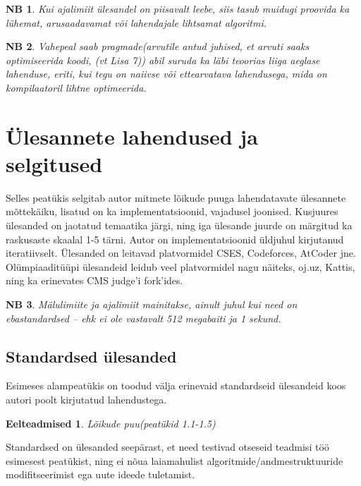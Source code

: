 \documentclass{trkut}
\newtheorem*{prereq}{Eelteadmised}
\newtheorem*{extra}{NB}
\begin{document}
\begin{extra}
Kui ajalimiit ülesandel on piisavalt leebe, siis tasub muidugi proovida ka lühemat, arusaadavamat või lahendajale lihtsamat algoritmi.
\end{extra}
\begin{extra}
Vahepeal saab pragmade(arvutile antud juhised, et arvuti saaks optimiseerida koodi, (vt Lisa 7)) abil suruda ka läbi teoorias liiga aeglase lahenduse, eriti, kui tegu on naiivse või ettearvatava lahendusega, mida on kompilaatoril lihtne optimeerida.
\end{extra}

\section{Ülesannete lahendused ja selgitused} 
Selles peatükis selgitab autor mitmete lõikude puuga lahendatavate ülesannete mõttekäiku, lisatud on ka implementatsioonid, vajadusel joonised.
Kusjuures ülesanded on jaotatud temaatika järgi, ning iga ülesande juurde on märgitud ka raskusaste skaalal 1-5 tärni.
Autor on implementatsioonid üldjuhul kirjutanud iteratiivselt.
Ülesanded on leitavad platvormidel CSES, Codeforces, AtCoder jne.
Olümpiaaditüüpi ülesandeid leidub veel platvormidel nagu näiteks, oj.uz, Kattis, ning ka erinevates CMS judge'i fork'ides.
\begin{extra}
Mälulimiite ja ajalimiit mainitakse, ainult juhul kui need on ebastandardsed -- ehk ei ole vastavalt 512 megabaiti ja 1 sekund.
\end{extra}
\subsection{Standardsed ülesanded}
Esimeses alampeatükis on toodud välja erinevaid standardseid ülesandeid koos autori poolt kirjutatud lahendustega.
\begin{prereq}
Lõikude puu(peatükid 1.1-1.5)
\end{prereq}
Standardsed on ülesanded seepärast, et need testivad otseseid teadmisi töö esimesest peatükist, ning ei nõua laiamahulist algoritmide/andmestruktuuride modifitseerimist ega uute ideede tuletamist.
\end{document}
